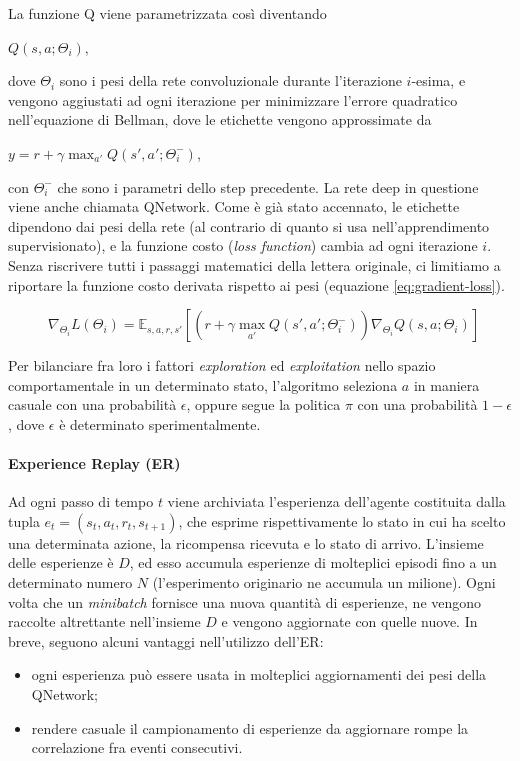 \documentclass[twoside,twocolumn,10pt]{extarticle}
\theoremstyle{definition}
\begin{document}
		La funzione Q viene parametrizzata così diventando
		\begin{center}
			$Q(s, a; \Theta_i)$,
		\end{center}
		dove $\Theta_i$ sono i pesi della rete convoluzionale durante l'iterazione $i$-esima, e vengono aggiustati ad ogni iterazione per minimizzare l'errore quadratico nell'equazione di Bellman, dove le etichette vengono approssimate da
		\begin{center}
			$y = r + \gamma \max_{a'} Q(s', a'; \Theta_i^-)$,
		\end{center}
		con $\Theta_i^-$ che sono i parametri dello step precedente. La rete deep in questione viene anche chiamata Q\texttwelveudash Network. Come è già stato accennato, le etichette dipendono dai pesi della rete (al contrario di quanto si usa nell'apprendimento supervisionato), e la funzione costo (\textit{loss function}) cambia ad ogni iterazione $i$. Senza riscrivere tutti i passaggi matematici della lettera originale, ci limitiamo a riportare la funzione costo derivata rispetto ai pesi (equazione \ref{eq:gradient-loss}).
		\begin{figure}
			\begin{equation}\label{eq:gradient-loss}
				\nabla_{\Theta_i} L(\Theta_i) = \mathbb{E}_{s, a, r, s'} [(r + \gamma \max_{a'} Q(s', a'; \Theta_i^-)) \nabla_{\Theta_i} Q(s, a; \Theta_i)]
			\end{equation}
		\end{figure}
		Per bilanciare fra loro i fattori \textit{exploration} ed \textit{exploitation} nello spazio comportamentale in un determinato stato, l'algoritmo seleziona $a$ in maniera casuale con una probabilità $\epsilon$, oppure segue la politica $\pi$ con una probabilità $1 - \epsilon$, dove $\epsilon$ è determinato sperimentalmente.

		\paragraph*{Experience Replay (ER)} Ad ogni passo di tempo $t$ viene archiviata l'esperienza dell'agente costituita dalla tupla $e_t = (s_t, a_t, r_t, s_{t + 1})$, che esprime rispettivamente lo stato in cui ha scelto una determinata azione, la ricompensa ricevuta e lo stato di arrivo. L'insieme delle esperienze è $D$, ed esso accumula esperienze di molteplici episodi fino a un determinato numero $N$ (l'esperimento originario ne accumula un milione). Ogni volta che un \textit{minibatch} fornisce una nuova quantità di esperienze, ne vengono raccolte altrettante nell'insieme $D$ e vengono aggiornate con quelle nuove. In breve, seguono alcuni vantaggi nell'utilizzo dell'ER:
		\begin{itemize}
			\item ogni esperienza può essere usata in molteplici aggiornamenti dei pesi della Q\texttwelveudash Network;
			\item rendere casuale il campionamento di esperienze da aggiornare rompe la correlazione fra eventi consecutivi.
		\end{itemize}
	
\end{document}
